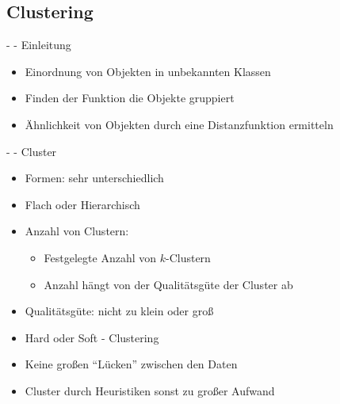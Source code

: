 \documentclass[fleqn,11pt,aspectratio=43]{beamer}
\begin{document}
\subsection{Clustering~}

\begin{frame}{\insertsectionhead - \insertsubsectionhead - Einleitung \cite{ester2000knowledge}}
\begin{itemize}
\item Einordnung von Objekten in unbekannten Klassen
\item Finden der Funktion die Objekte gruppiert
\item Ähnlichkeit von Objekten durch eine Distanzfunktion ermitteln
\end{itemize}
\end{frame}

\begin{frame}{\insertsectionhead - \insertsubsectionhead - Cluster \cite{dwh}}
\begin{itemize}
\item Formen: sehr unterschiedlich
\item Flach oder Hierarchisch
\item Anzahl von Clustern:
\begin{itemize}
\item Festgelegte Anzahl von $k$-Clustern
\item Anzahl hängt von der Qualitätsgüte der Cluster ab
\end{itemize} 
\item Qualitätsgüte: nicht zu klein oder groß
\item Hard oder Soft - Clustering
\item Keine großen \enquote{Lücken} zwischen den Daten
\item Cluster durch Heuristiken sonst zu großer Aufwand
\end{itemize}
\end{frame}
\end{document}
